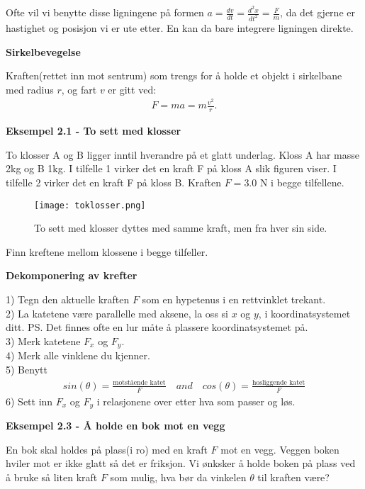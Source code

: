 \documentclass[11pt,a4paper]{article}
\numberwithin{equation}{section}
\begin{document}
Ofte vil vi benytte disse ligningene på formen $a = \frac{dv}{dt} = \frac{d^2 x}{dt^2} = \frac{F}{m}$, da det gjerne er hastighet og posisjon vi er ute etter. En kan da bare integrere ligningen direkte.  

\textbf{Sirkelbevegelse}

Kraften(rettet inn mot sentrum) som trengs for å holde et objekt i sirkelbane med radius $r$, og fart $v$ er gitt ved:
\begin{align}
F = ma = m\frac{v^2}{r} .
\end{align} 

\newpage

\textbf{Eksempel 2.1 - To sett med klosser}

To klosser A og B ligger inntil hverandre på et glatt underlag. Kloss A har masse 2kg og B 1kg. I tilfelle 1
virker det en kraft F på kloss A slik figuren viser.
I tilfelle 2 virker det en kraft F på kloss B. Kraften $F = 3.0$ N i begge tilfellene. 

\begin{figure}[h!]
\begin{center}
  \texttt{[image: toklosser.png]}
  \end{center}
  \caption{To sett med klosser dyttes med samme kraft, men fra hver sin side.}
\end{figure}
Finn kreftene mellom klossene i begge tilfeller.

\textbf{Dekomponering av krefter}

1) Tegn den aktuelle kraften $F$ som en hypetenus i en rettvinklet trekant. \\
2) La katetene være parallelle med aksene, la oss si $x$ og $y$, i koordinatsystemet ditt. PS. Det finnes ofte en lur måte å plassere koordinatsystemet på. \\
3) Merk katetene $F_x$ og $F_y$. \\
4) Merk alle vinklene du kjenner. \\
5) Benytt
\begin{align*}
sin(\theta) = \frac{\text{motstående katet}}{F} \quad and \quad cos(\theta) = \frac{\text{hosliggende katet}}{F}
\end{align*}
6) Sett inn $F_x$ og $F_y$ i relasjonene over etter hva som passer og løs.

\newpage

\textbf{Eksempel 2.3 - Å holde en bok mot en vegg}

En bok skal holdes på plass(i ro) med en kraft $F$ mot en vegg. Veggen boken hviler mot er ikke glatt så det er friksjon. Vi ønksker å holde boken på plass ved å bruke så liten kraft $F$ som mulig, hva bør da vinkelen $\theta$ til kraften være? 
\end{document}
